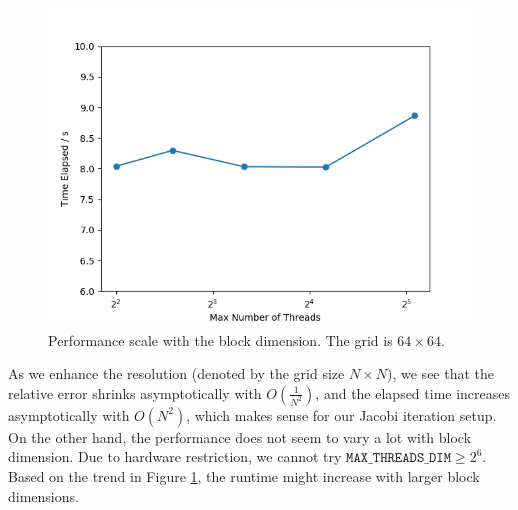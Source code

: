 \begin{solution}
\begin{figure}[H]
    \centering
    \includegraphics[scale=0.4]{YiqiXie/thr_time.png}
    \caption{Performance scale with the block dimension. The grid is $64\times 64$. }
    \label{fig:p2_thr}
\end{figure}

As we enhance the resolution (denoted by the grid size $N\times N$), we see that the relative error shrinks asymptotically with $O(\frac{1}{N^2})$, and the elapsed time increases asymptotically with $O(N^2)$, which makes sense for our Jacobi iteration setup. On the other hand, the performance does not seem to vary a lot with block dimension. Due to hardware restriction, we cannot try $\texttt{MAX\_THREADS\_DIM}\geq 2^6$. Based on the trend in Figure \ref{fig:p2_thr}, the runtime might increase with larger block dimensions. 

\end{solution}